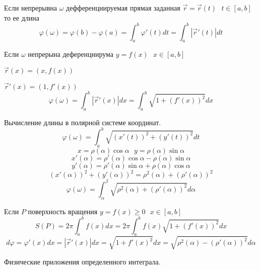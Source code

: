   Если непрерывна $\omega$ дефференциируемая прямая заданная
  $\vec r = \vec r (t) ~~~ t \in [a,b]$ то ее длина
  $$
  \varphi (\omega) = \varphi(b) - \varphi(a) = \int_a^b \varphi' (t) dt =
  \int_a^b | \vec r'(t) | dt
  $$

  Если $\omega$ непрерына деференциирума $y = f(x) ~~~ x \in [a,b]$

$\vec r(x) = (x, f(x))$

$\vec r'(x) = (1, f'(x))$
$$
\varphi(\omega) = \int_a^b |\vec r'(x)|dx = \int_a^b \sqrt{1 + (f'(x))^2}dx
$$

  Вычисление длины в полярной системе координат.
$$
\varphi (\omega) = \int_a^b \sqrt{(x'(t))^2 + (y'(t))^2}dt
$$
$$
x = \rho (\alpha) \cos \alpha ~~~ y = \rho (\alpha) \sin \alpha
$$
$$
x'(\alpha) = \rho'(\alpha) \cos \alpha - \rho(\alpha) \sin \alpha
$$
$$
y'(\alpha) = \rho'(\alpha) \sin \alpha + \rho(\alpha) \cos \alpha
$$
$$
(x'(\alpha))^2 + (y'(\alpha))^2 = \rho^2(\alpha) + (\rho'(\alpha))^2
$$
$$
\varphi (\omega) = \int_{\alpha}^{\beta}
\sqrt{\rho^2 (\alpha) + (\rho'(\alpha))^2} d\alpha
$$

  Если $P$ поверхность вращения $y=f(x) \ge 0 ~~~ x \in [a,b]$
$$
S(P) = 2\pi \int_a^b f(x)dx = 2\pi \int_a^b f(x) \sqrt{1 + (f'(x))^2} dx
$$
$$
d\varphi = \varphi' (x)dx = |\vec r'(x)|dx = \sqrt{1+f'(x)^2}dx =
\sqrt{\rho^2 (\alpha) - (\rho'(\alpha))^2} d\alpha
$$

\begin{title}[\Large]
  Физические приложения определенного интеграла.
\end{title}

